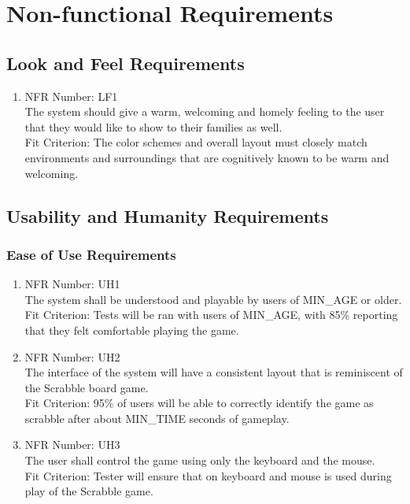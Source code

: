 \documentclass[12pt, titlepage]{article}
\begin{document}
\section{Non-functional Requirements}

\subsection{Look and Feel Requirements}
\begin{enumerate}
    \item NFR Number: LF1\\ %
    The system should give a warm, welcoming and homely feeling to the user that they would like to show to their families as well.\\
    Fit Criterion: The color schemes and overall layout must closely match environments and surroundings that are cognitively known to be warm and welcoming.
\end{enumerate}

\subsection{Usability and Humanity Requirements}
\subsubsection{Ease of Use Requirements}
\begin{enumerate}
    \item NFR Number: UH1\\ %
    The system shall be understood and playable by users of MIN\_AGE or older.\\
    Fit Criterion: Tests will be ran with users of MIN\_AGE, with 85\% reporting that they felt comfortable playing the game.
    \item NFR Number: UH2\\
    The interface of the system will have a consistent layout that is reminiscent of the Scrabble board game.\\
    Fit Criterion: 95\% of users will be able to correctly identify the game as scrabble after about MIN\_TIME seconds of gameplay. 
    \item NFR Number: UH3\\
    The user shall control the game using only the keyboard and the mouse.\\
    Fit Criterion: Tester will ensure that on keyboard and mouse is used during play of the Scrabble game.
\end{enumerate}
\end{document}
